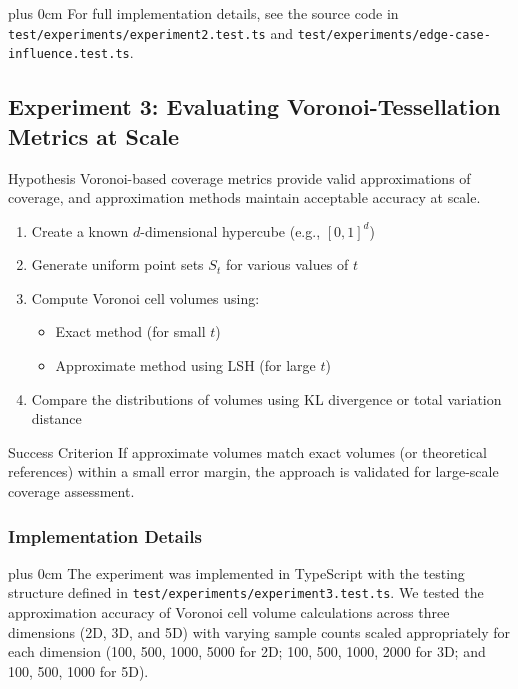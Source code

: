 \documentclass[conference]{IEEEtran}
\newcommand{\justifytext}{\leftskip=0pt \rightskip=0pt plus 0cm}
\begin{document}
\justifytext
For full implementation details, see the source code in \texttt{test/experiments/experiment2.test.ts} and \texttt{test/experiments/edge-case-influence.test.ts}.

\subsection{Experiment 3: Evaluating Voronoi-Tessellation Metrics at Scale}

\begin{theorembox}{Hypothesis}
Voronoi-based coverage metrics provide valid approximations of coverage, and approximation methods maintain acceptable accuracy at scale.
\end{theorembox}

\begin{tcolorbox}[
  colback=blue!5!white,
  colframe=blue!75!black,
  title=Experimental Design,
  fonttitle=\bfseries
]
\begin{enumerate}
\item Create a known $d$-dimensional hypercube (e.g., $[0,1]^d$)
\item Generate uniform point sets $S_t$ for various values of $t$
\item Compute Voronoi cell volumes using:
   \begin{itemize}
   \item Exact method (for small $t$)
   \item Approximate method using LSH (for large $t$)
   \end{itemize}
\item Compare the distributions of volumes using KL divergence or total variation distance
\end{enumerate}
\end{tcolorbox}

\begin{definitionbox}{Success Criterion}
If approximate volumes match exact volumes (or theoretical references) within a small error margin, the approach is validated for large-scale coverage assessment.
\end{definitionbox}

\subsubsection{Implementation Details}

\justifytext
The experiment was implemented in TypeScript with the testing structure defined in \texttt{test/experiments/experiment3.test.ts}. We tested the approximation accuracy of Voronoi cell volume calculations across three dimensions (2D, 3D, and 5D) with varying sample counts scaled appropriately for each dimension (100, 500, 1000, 5000 for 2D; 100, 500, 1000, 2000 for 3D; and 100, 500, 1000 for 5D).
\end{document}
